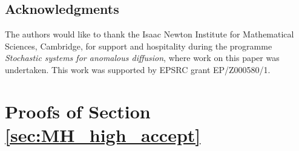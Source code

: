 \documentclass{article}
\theoremstyle{definition}
\theoremstyle{plain}
\begin{document}
\subsection*{Acknowledgments}

The authors would like to thank the Isaac Newton Institute for Mathematical Sciences, Cambridge, for support and hospitality during the programme \textit{Stochastic systems for anomalous diffusion}, where work on this paper was undertaken. This work was supported by EPSRC grant EP/Z000580/1.

\clearpage
\renewcommand*{\thepage}{References | Page \arabic{page}}




\clearpage
\renewcommand*{\thepage}{A.\arabic{page}}
\renewcommand{\thesection}{\Alph{section}}
\appendix


\section{Proofs of Section \ref{sec:MH_high_accept}}
\label{app:proofs_MH_high_accept}
\end{document}
